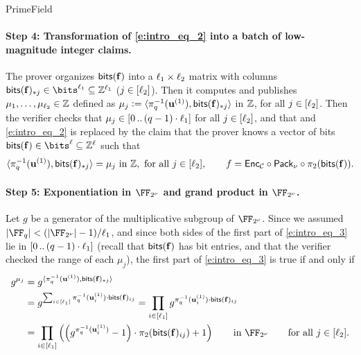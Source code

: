 \begin{lncsmove}{PrimeField}
 \paragraph{Step 4: Transformation of \eqref{e:intro_eq_2} into a batch of low-magnitude integer claims.} The prover organizes $\mathsf{bits}(\mathbf{f})$ into a $\ell_1\times \ell_2$ matrix with columns $\bitstext(\bff)_{*j}\in \bits^{\codedim_1}\subseteq \ZZ^{\codedim_1}$ ($j\in [\ell_2]$). Then it computes and publishes   $\mu_1,\ldots, \mu_{\ell_2}\in  \mathbb{Z}$ defined as 
         $\mu_j{\;\vcentcolon=\;}\langle \pi_q^{-1}(\mathbf{u}^{(1)}), \mathsf{bits}(\mathbf{f})_{*j}\rangle$  in $\mathbb{Z}$, for all $j\in [\ell_2]$.  
         Then the verifier checks that $\mu_j\in [0 \, .. \, (q-1)\cdot \ell_1]$ for all $j\in [\ell_2]$, and that 
         and \eqref{e:intro_eq_2} is replaced by the  claim that the prover knows a vector of bits $\bitstext(\bff)\in\bits^\codedim\subseteq\ZZ^\codedim$ such that \begin{equation}\label{e:intro_eq_3}\langle \pi_q^{-1}(\mathbf{u}^{(1)}), \mathsf{bits}(\mathbf{f})_{*j}\rangle =\mu_j \ \text{in  } \mathbb{Z}, \text{ for all } j\in [\ell_2], \qquad f = \mathsf{Enc}_{\mathcal{C}}\circ \mathsf{Pack}_\nu \circ \pi_2(\mathsf{bits}(\mathbf{f})).
        \end{equation} 
       
        
        
        
        \paragraph{Step 5: Exponentiation in $\comfield$ and grand product in $\comfield$.}  Let $g$ be a generator of the multiplicative subgroup of $\comfield$. Since we assumed $|\FF_q|< \fieldboundsizeexponent$, and since both sides of the first part of \eqref{e:intro_eq_3} lie in $[0 \, .. \, (q-1)\cdot \ell_1]$ (recall that $\mathsf{bits}(\mathbf{f})$ has bit entries, and that the verifier checked the range of each $\mu_j$), the first part of \eqref{e:intro_eq_3} is true if and only if 
          \begin{equation}\label{e:intro_eq_4}
          \begin{aligned}
          g^{\mu_j}  &= g^{\langle \pi_q^{-1}(\uu^{(1)}), \bitstext(\bff)_{*j}\rangle}\\ &= g^{\sum_{i\in[\codedim_1]} \pi_q^{-1}(\uu_i^{(1)}) \cdot \bitstext(\bff)_{ij} } = \prod_{i\in [\codedim_1]} g^{ \pi_q^{-1}(\uu_i^{(1)}) \cdot \bitstext(\bff)_{ij} } 
          \\ &= \prod_{i\in [\codedim_1]} \left(\left(g^{\pi_q^{-1}(\uu_i^{(1)})} -1\right)\cdot \pi_2(\bitstext(\bff)_{ij})  +1\right) \qquad \text{in  } \comfield \qquad \text{for all } j\in [\codedim_2].
          \end{aligned}
        \end{equation} 


\end{lncsmove}
